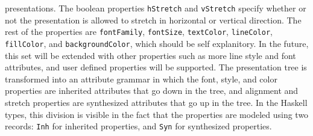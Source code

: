         presentations. The boolean properties \texttt{hStretch} and \texttt{vStretch}
        specify whether or not the presentation is allowed to stretch in horizontal or
        vertical direction. The rest of the properties are \texttt{fontFamily},
        \texttt{fontSize}, \texttt{textColor}, \texttt{lineColor}, \texttt{fillColor},
        and \texttt{backgroundColor}, which should be self explanitory. In the future,
        this set will be extended with other properties such as more line style and
        font attributes, and user defined properties will be supported. The
        presentation tree is transformed into an attribute grammar in which the font,
        style, and color properties are inherited attributes that go down in the tree,
        and alignment and stretch properties are synthesized attributes that go up in
        the tree. In the Haskell types, this division is visible in the fact that the
        properties are modeled using two records: \texttt{Inh} for inherited
        properties, and \texttt{Syn} for synthesized properties.
